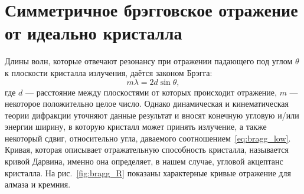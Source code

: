 \section{Симметричное брэгговское отражение от идеально кристалла}\label{diamond cry absorb}
Длины волн, которые отвечают резонансу при отражении падающего под углом $\theta$ к плоскости кристалла излучения, даётся законом Брэгга:  
\begin{equation}
	\label{eq:bragg_low}
	m\lambda = 2d\sin\theta,
\end{equation}
где $d$ --- расстояние между плоскостями от которых происходит отражение, $m$ --- некоторое положительно целое число. Однако динамическая и кинематическая теории дифракции уточняют данные результат и вносят конечную угловую и/или энергии ширину, в которую кристалл может принять излучение, а также некоторый сдвиг, относительно угла, даваемого соотношением~\ref{eq:bragg_low}. Кривая, которая описывает отражательную способность кристалла, называется кривой Дарвина, именно она определяет, в нашем случае, угловой акцептанс кристалла. На рис.~\ref{fig:bragg_R} показаны характерные кривые отражение для алмаза и кремния. 
